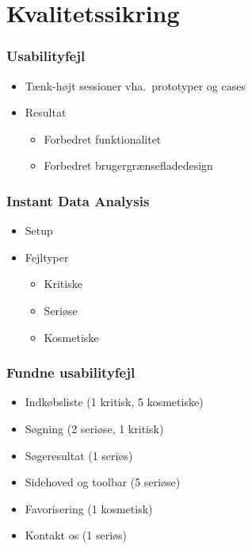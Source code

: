 \section{Kvalitetssikring}

\begin{frame}
	\frametitle{Usabilityfejl}
  \begin{itemize}
    \item Tænk-højt sessioner vha.\ prototyper og cases
    \item Resultat
    \begin{itemize}
      \item Forbedret funktionalitet
      \item Forbedret brugergrænsefladedesign
    \end{itemize}
  \end{itemize}
\end{frame}

\begin{frame}
	\frametitle{Instant Data Analysis}
  \begin{itemize}
	  \item Setup
    \item Fejltyper
      \begin{itemize}
        \item Kritiske
        \item Seriøse
        \item Kosmetiske
      \end{itemize}
  \end{itemize}
\end{frame}

\begin{frame}
	\frametitle{Fundne usabilityfejl}
    \begin{itemize}
	  \item Indkøbsliste (1 kritisk, 5 kosmetiske)
    \item Søgning (2 seriøse, 1 kritisk)
    \item Søgeresultat (1 seriøs)
    \item Sidehoved og toolbar (5 seriøse)
    \item Favorisering (1 kosmetisk)
    \item Kontakt os (1 seriøs)
  \end{itemize}
\end{frame}